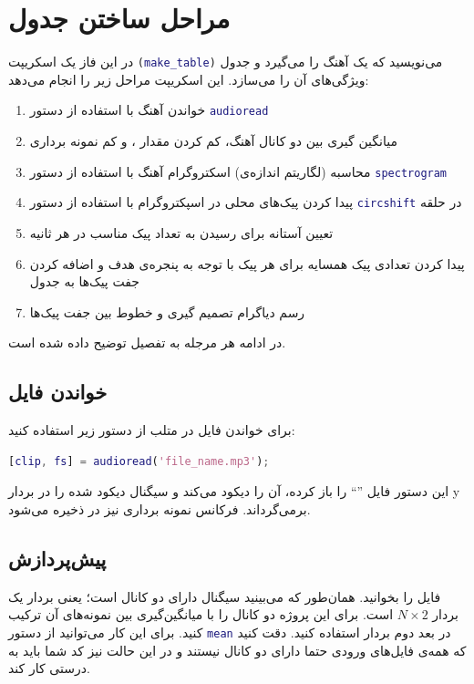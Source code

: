 \documentclass{utsignal}
\begin{document}
	\section{مراحل ساختن جدول}
	در این فاز یک اسکریپت \lstinline[language=Matlab]{(make_table)} می‌نویسید که یک آهنگ را می‌گیرد و جدول ویژگی‌های آن را می‌سازد. این اسکریپت مراحل زیر را انجام می‌دهد:
	\begin{enumerate}
		\item خواندن آهنگ با استفاده از دستور \lstinline[language=Matlab]{audioread}
		\item میانگین گیری بین دو کانال آهنگ، کم کردن مقدار ، و کم نمونه برداری
		\item محاسبه (لگاریتم اندازه‌ی) اسکتروگرام آهنگ با استفاده از دستور \lstinline[language=Matlab]{spectrogram}
		\item پیدا کردن پیک‌های محلی در اسپکتروگرام با استفاده از دستور \lstinline[language=Matlab]{circshift} در حلقه
		\item تعیین آستانه برای رسیدن به تعداد پیک مناسب در هر ثانیه
		\item پیدا کردن تعدادی پیک همسایه برای هر پیک با توجه به پنجره‌ی هدف و اضافه کردن جفت پیک‌ها به جدول
		\item رسم دیاگرام تصمیم گیری و خطوط بین جفت پیک‌ها
	\end{enumerate}
	در ادامه هر مرجله به تفصیل توضیح داده شده است.
	
	\subsection{خواندن فایل }
	برای خواندن فایل  در متلب از دستور زیر استفاده کنید:
	\begin{latin}
		\begin{lstlisting}[language=Matlab]
	[clip, fs] = audioread('file_name.mp3');\end{lstlisting}
	\end{latin}
	این دستور فایل ''`` را باز کرده، آن را دیکود می‌کند و سیگنال دیکود شده را در بردار y برمی‌گرداند. فرکانس نمونه برداری نیز در  ذخیره می‌شود.
	\subsection{پیش‌پردازش}
	فایل  را بخوانید. همان‌طور که می‌بینید سیگنال دارای دو کانال است؛ یعنی بردار  یک بردار $N\times 2$ است. برای این پروژه دو کانال را با میانگین‌گیری بین نمونه‌های آن ترکیب کنید. برای این کار می‌توانید از دستور \lstinline[language=Matlab]{mean} در بعد دوم بردار  استفاده کنید. دقت کنید که همه‌ی فایل‌های ورودی حتما دارای دو کانال نیستند و در این حالت نیز کد شما باید به درستی کار کند.
	
\end{document}
